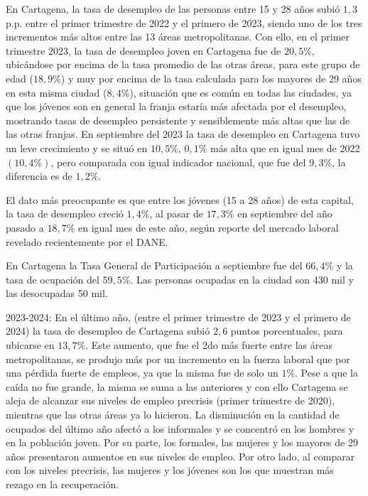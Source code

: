 \documentclass[letterpaper, 12pt]{article}
\begin{document}


En Cartagena, la tasa de desempleo de las personas entre 15 y 28 años subió
$1,3$ p.p. entre el primer trimestre de 2022 y el primero de 2023, siendo uno 
de los tres incrementos más altos entre las 13 áreas metropolitanas. Con 
ello, en el primer trimestre 2023, la tasa de desempleo joven en Cartagena 
fue de $20,5\%$, ubicándose por encima de la tasa promedio de las otras 
áreas, para este grupo de edad ($18,9\%$) y muy por encima de la tasa 
calculada para los mayores de 29 años en esta misma ciudad ($8,4\%$), 
situación que es común en todas las ciudades, ya que los jóvenes son en 
general la franja estaría más afectada por el desempleo, mostrando tasas de 
desempleo persistente y sensiblemente más altas que las de las otras franjas.
En septiembre del 2023 la tasa de desempleo en Cartagena tuvo un leve 
crecimiento y se situó en $10,5\%$, $0,1\%$ más alta que en igual mes de 2022
$(10,4\%)$, pero comparada con igual indicador nacional, que fue del $9,3\%$,
la diferencia es de $1,2\%$.

El dato más preocupante es que entre los jóvenes (15 a 28 años) de esta 
capital, la tasa de desempleo creció $1,4\%$, al pasar de $17,3\%$ en 
septiembre del año pasado a $18,7\%$ en igual mes de este año, según reporte
del mercado laboral revelado recientemente por el DANE. 



En Cartagena la Tasa General de Participación a septiembre fue del $66,4\%$ 
y la tasa de ocupación del $59,5\%$. Las personas ocupadas en la ciudad son
430 mil y las desocupadas 50 mil. 

2023-2024: En el último año, (entre el primer trimestre de 2023 y el primero
de 2024) la tasa de desempleo de Cartagena subió $2,6$ puntos porcentuales,
para ubicarse en $13,7\%$. Este aumento, que fue el 2do más fuerte entre las
áreas metropolitanas, se produjo más por un incremento en la fuerza laboral
que por una pérdida fuerte de empleos, ya que la misma fue de solo un $1$\%.
Pese a que la caída no fue grande, la misma se suma a las anteriores y con 
ello Cartagena se aleja de alcanzar sus niveles de empleo precrisis (primer
trimestre de 2020), mientras que las otras áreas ya lo hicieron. La 
disminución en la cantidad de ocupados del último año afectó a los informales 
y se concentró en los hombres y en la población joven. Por su parte, los 
formales, las mujeres y los mayores de 29 años presentaron aumentos en sus 
niveles de empleo. Por otro lado, al comparar con los niveles precrisis, las 
mujeres y los jóvenes son los que muestran más rezago en la recuperación.
\end{document}
